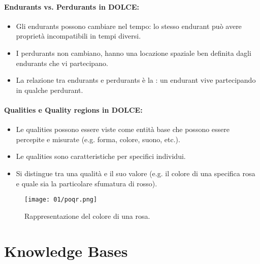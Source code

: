 

\paragraph{Endurants vs. Perdurants in DOLCE:}

\begin{itemize}
  \item Gli endurants possono cambiare nel tempo: lo stesso endurant può avere proprietà incompatibili in tempi diversi. 
  \item I perdurants non cambiano, hanno una locazione spaziale ben definita dagli endurants che vi partecipano.
  \item La relazione tra endurants e perdurants è la : un endurant vive partecipando in qualche perdurant. 
\end{itemize}

\paragraph{Qualities e Quality regions in DOLCE:}

\begin{itemize}
  \item Le qualities possono essere viste come entità base che possono essere percepite e misurate (e.g. forma, colore, suono, etc.). 
  \item Le qualities sono caratteristiche per specifici individui. 
  \item Si distingue tra una qualità e il suo valore (e.g. il colore di una specifica rosa e quale sia la particolare sfumatura di rosso).
\end{itemize}


\begin{figure}[h]
    \centering
    \texttt{[image: 01/poqr.png]}
    \caption{Rappresentazione del colore di una rosa.}
\end{figure}

\section{Knowledge Bases}




